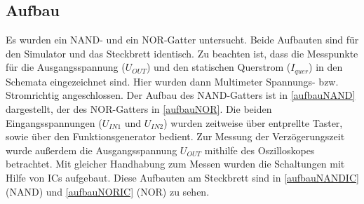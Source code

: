 \documentclass[11pt, a4paper]{article}
\begin{document}
\subsection*{Aufbau}
Es wurden ein NAND- und ein NOR-Gatter untersucht. Beide Aufbauten sind für den Simulator und das Steckbrett identisch.
Zu beachten ist, dass die Messpunkte für die Ausgangsspannung ($U_{OUT}$) und den statischen Querstrom ($I_{quer}$) in den Schemata eingezeichnet sind. Hier wurden dann Multimeter Spannungs- bzw. Stromrichtig angeschlossen.
Der Aufbau des NAND-Gatters ist in \autoref{aufbauNAND} dargestellt, der des NOR-Gatters in \autoref{aufbauNOR}. Die beiden Eingangsspannungen ($U_{IN1}$ und $U_{IN2}$) wurden zeitweise über entprellte Taster, sowie über den Funktionsgenerator bedient.
Zur Messung der Verzögerungszeit wurde außerdem die Ausgangsspannung $U_{OUT}$ mithilfe des Oszilloskopes betrachtet.
Mit gleicher Handhabung zum Messen wurden die Schaltungen mit Hilfe von ICs aufgebaut. Diese Aufbauten am Steckbrett sind in \autoref{aufbauNANDIC} (NAND) und \autoref{aufbauNORIC} (NOR) zu sehen.
\end{document}
